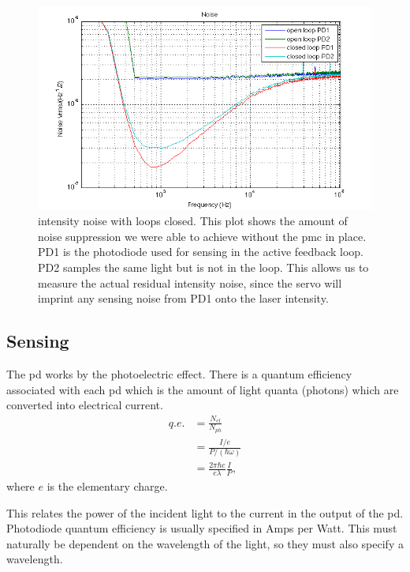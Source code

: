 \begin{figure}[htbp]
  \centering
  \includegraphics[width=15cm]{./figures/cln.png}
  \caption[ISS Closed Loop Noise]{
    intensity noise with loops closed.
    This plot shows the amount of noise suppression we were able to achieve
    without the \ac{pmc} in place.
    PD1 is the photodiode used for sensing in the active feedback loop.
    PD2 samples the same light but is not in the loop.
    This allows us to measure the actual residual intensity noise, since the
    servo will imprint any sensing noise from PD1 onto the laser intensity.
  }
  \label{fig:isscln}
\end{figure}

\subsection{Sensing}

The \ac{pd} works by the photoelectric effect. There is a quantum
efficiency associated with each \ac{pd} which is the amount of light quanta
(photons) which are converted into electrical current.
\begin{align}
q.e. &= \frac{N_{el}}{N_{ph}} \\
     &= \frac{I/e}{P/(\hbar \omega)} \\
     &= \frac{2 \pi \hbar c}{e \lambda} \frac{I}{P} ,
\end{align}
where $e$ is the elementary charge.

This relates the
power of the incident light to the current in the output of the \ac{pd}.
Photodiode quantum efficiency is usually specified in Amps per Watt.
This must naturally be dependent on the wavelength of the light, so they must
also specify a wavelength.


